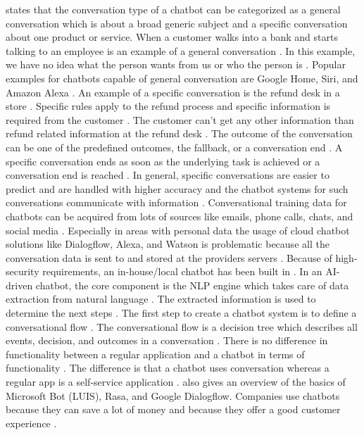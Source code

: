 \citet{singhbuilding} states that the conversation type of a chatbot can be categorized as a general conversation 
which is about a broad generic subject and a specific conversation about one product or service.
When a customer walks into a bank and starts talking to an employee is an example of a general conversation \cite{singhbuilding}.
In this example, we have no idea what the person wants from us or who the person is \cite{singhbuilding}.
Popular examples for chatbots capable of general conversation are Google Home, Siri, and Amazon Alexa \cite{singhbuilding}.
An example of a specific conversation is the refund desk in a store \cite{singhbuilding}. 
Specific rules apply to the refund process and specific information is required from the customer \cite{singhbuilding}. 
The customer can't get any other information than refund related information at the refund desk \cite{singhbuilding}. 
The outcome of the conversation can be one of the predefined outcomes, the fallback, or a conversation end \cite{singhbuilding}. 
A specific conversation ends as soon as the underlying task is achieved or a conversation end is reached \cite{singhbuilding}. 
In general, specific conversations are easier to predict and are handled with higher accuracy and the chatbot systems 
for such conversations communicate with information \cite{singhbuilding}. 
Conversational training data for chatbots can be acquired from lots of sources like emails, phone calls, chats, and social media \cite{singhbuilding}.
Especially in areas with personal data the usage of cloud chatbot solutions like Dialogflow, Alexa, and Watson 
is problematic because all the conversation data is sent to and stored at the providers servers \cite{singhbuilding}.
Because of high-security requirements, an in-house/local chatbot has been built in \citet{singhbuilding}.
In an AI-driven chatbot, the core component is the NLP engine which takes care of data extraction from natural language \cite{singhbuilding}.
The extracted information is used to determine the next steps \cite{singhbuilding}.
The first step to create a chatbot system is to define a conversational flow \cite{singhbuilding}.
The conversational flow is a decision tree which describes all events, decision, and outcomes in a conversation \cite{singhbuilding}.
There is no difference in functionality between a regular application and a chatbot in terms of functionality \cite{singhbuilding}. 
The difference is that a chatbot uses conversation whereas a regular app is a self-service application \cite{singhbuilding}. 
\citet{singhbuilding} also gives an overview of the basics of Microsoft Bot (LUIS), Rasa, and Google Dialogflow.
Companies use chatbots because they can save a lot of money and because they offer a good customer experience \cite{singhbuilding}.


